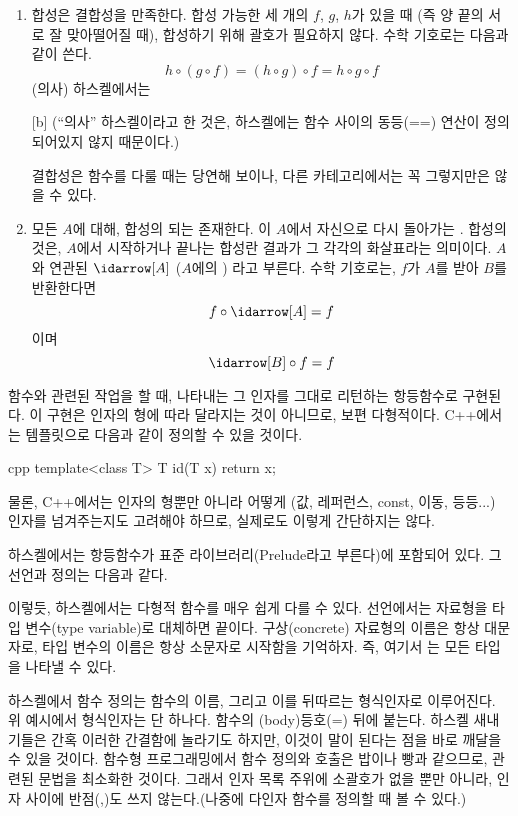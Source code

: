 \begin{enumerate}
\item
합성은 결합성을 만족한다. 합성 가능한 세 개의 \trMorphism $f$, $g$, $h$가 있을 때
(즉 양 끝의  서로 잘 맞아떨어질 때), 합성하기 위해 괄호가 필요하지 않다.
수학 기호로는 다음과 같이 쓴다.
\[h \circ (g \circ f) = (h \circ g) \circ f = h \circ g \circ f\]
(의사) 하스켈에서는

[b]
(``의사'' 하스켈이라고 한 것은, 하스켈에는 함수 사이의 동등(==) 연산이 정의되어있지 않지 때문이다.)

결합성은 함수를 다룰 때는 당연해 보이나, 다른 카테고리에서는 꼭 그렇지만은 않을 수 있다.

\item
모든 \trObject $A$에 대해, 합성의  되는  존재한다.
이  $A$에서 자신으로 다시 돌아가는 . 
합성의  것은, $A$에서 시작하거나 끝나는  합성란 결과가 그 각각의 화살표라는 의미이다.
\trObject $A$와 연관된 \trUnit {} $\idarrow[A]$ ($A$에의 \newterm{\trIdentity}) 라고 부른다.
수학 기호로는, $f$가 $A$를 받아 $B$를 반환한다면
\[f \circ \idarrow[A] = f\]
이며
\[\idarrow[B] \circ f = f\]
\end{enumerate}
함수와 관련된 작업을 할 때,  나타내는  그 인자를 그대로 리턴하는 항등함수로 구현된다.
이 구현은 인자의 형에 따라 달라지는 것이 아니므로, 보편 다형적이다. 
C++에서는 템플릿으로 다음과 같이 정의할 수 있을 것이다.

\begin{snip}{cpp}
template<class T> T id(T x) { return x; }
\end{snip}
물론, C++에서는 인자의 형뿐만 아니라 어떻게 (값, 레퍼런스, const, 이동, 등등...) 인자를 넘겨주는지도 고려해야 하므로,
실제로도 이렇게 간단하지는 않다.

하스켈에서는 항등함수가 표준 라이브러리(Prelude라고 부른다)에 포함되어 있다. 
그 선언과 정의는 다음과 같다.

이렇듯, 하스켈에서는 다형적 함수를 매우 쉽게 다를 수 있다.
선언에서는 자료형을 타입 변수(type variable)로 대체하면 끝이다.
구상(concrete) 자료형의 이름은 항상 대문자로, 타입 변수의 이름은 항상 소문자로 시작함을 기억하자.
즉, 여기서 는 모든 타입을 나타낼 수 있다.

하스켈에서 함수 정의는 함수의 이름, 그리고 이를 뒤따르는 형식인자로 이루어진다.
위 예시에서 형식인자는  단 하나다.
함수의 \trFunctionBody(body)\는 등호(=) 뒤에 붙는다.
하스켈 새내기들은 간혹 이러한 간결함에 놀라기도 하지만, 이것이 말이 된다는 점을 바로 깨달을 수 있을 것이다.
함수형 프로그래밍에서 함수 정의와 호출은 밥이나 빵과 같으므로, 관련된 문법을 최소화한 것이다.
그래서 인자 목록 주위에 소괄호가 없을 뿐만 아니라, 인자 사이에 반점(,)도 쓰지 않는다.(나중에 다인자 함수를 정의할 때 볼 수 있다.)

